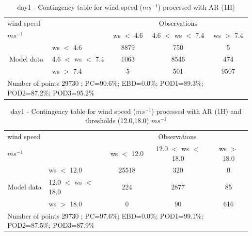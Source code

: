 \begin{table}[h!]
\begin{center}
\begin{tabular}{llccc}
\hline
{wind speed}                                       &                                                    & \multicolumn{3}{c}{Observations}                 \\
{$m s^{-1}$}                                       &                             & ws $<$ 4.6   & 4.6 $<$ ws $<$ 7.4 & ws $>$ 7.4 \\
\hline
\multicolumn{1}{c}{\multirow{3}{*}{Model data}}  & ws $<$ 4.6             & 8879                & 750                       & 5              \\
                                                 & 4.6  $<$ ws $<$ 7.4 & 1063                & 8546                       & 474              \\
                                                 & ws $>$ 7.4             & 5                & 501                       & 9507              \\
\hline 
\multicolumn{5}{l}{ Number of points        29730 ; PC=90.6\%; EBD=0.0\%; POD1=89.3\%; POD2=87.2\%; POD3=95.2\%}                 \\
\end{tabular}
\end{center}
\caption{day1 - Contingency table for  wind speed ($m s^{-1}$) processed with AR (1H)}
\label{tab:contingencywsAFT:day1}
\end{table}
\begin{table}[h!]
\begin{center}
\begin{tabular}{llccc}
\hline
{wind speed}                                       &                                                    & \multicolumn{3}{c}{Observations}                 \\
{$m s^{-1}$}                                       &                             & ws $<$ 12.0   & 12.0 $<$ ws $<$ 18.0 & ws $>$ 18.0 \\
\hline
\multicolumn{1}{c}{\multirow{3}{*}{Model data}}  & ws $<$ 12.0             & 25518                & 320                       & 0              \\
                                                 & 12.0  $<$ ws $<$ 18.0 & 224                & 2877                       & 85              \\
                                                 & ws $>$ 18.0             & 0                & 90                       & 616              \\
\hline 
\multicolumn{5}{l}{ Number of points        29730 ; PC=97.6\%; EBD=0.0\%; POD1=99.1\%; POD2=87.5\%; POD3=87.9\%}                 \\
\end{tabular}
\end{center}
\caption{day1 - Contingency table for  wind speed ($m s^{-1}$) processed with AR (1H) and thresholds (12.0,18.0) $m s^{-1}$}
\label{tab:contingencywsAFT:day1}
\end{table}
